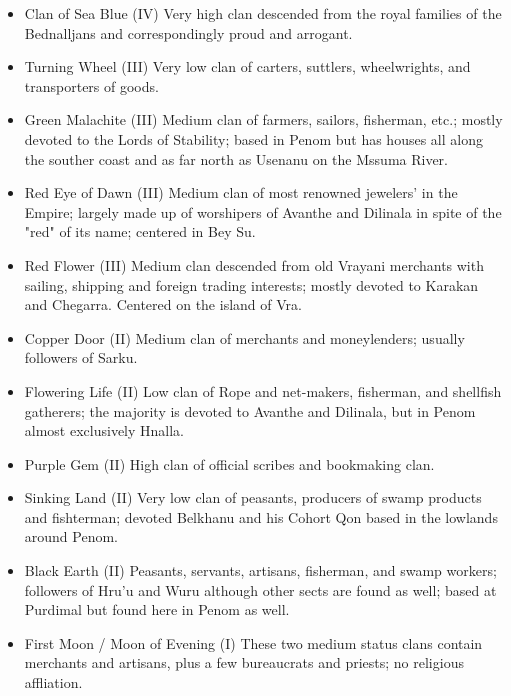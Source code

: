 \begin{itemize}

\item Clan of Sea Blue (IV) Very high clan descended from the royal families of the Bednalljans and correspondingly proud and arrogant. 
\item Turning Wheel (III) Very low clan of carters, suttlers, wheelwrights, and transporters of goods. 
\item Green Malachite (III) Medium clan of farmers, sailors, fisherman, etc.; mostly devoted to the Lords of Stability; based in Penom but has houses all along the souther coast and as far north as Usenanu on the Mssuma River. 
\item Red Eye of Dawn (III) Medium clan of most renowned jewelers' in the Empire; largely made up of worshipers of Avanthe and Dilinala in spite of the "red" of its name; centered in Bey Su.
\item Red Flower (III) Medium clan descended from old Vrayani merchants with sailing, shipping and foreign trading interests; mostly devoted to Karakan and Chegarra. Centered on the island of Vra.
\item Copper Door (II) Medium clan of merchants and moneylenders; usually followers of Sarku. 
\item Flowering Life (II) Low clan of Rope and net-makers, fisherman, and shellfish gatherers; the majority is devoted to Avanthe and Dilinala, but in Penom almost exclusively Hnalla.     
\item Purple Gem (II) High clan of official scribes and bookmaking clan.
\item Sinking Land (II) Very low clan of peasants, producers of swamp products and fishterman; devoted Belkhanu and his Cohort Qon based in the lowlands around Penom. 
\item Black Earth (II) Peasants, servants, artisans, fisherman, and swamp workers; followers of Hru'u and Wuru although other sects are found as well; based at Purdimal but found here in Penom as well.
\item First Moon / Moon of Evening (I) These two medium status clans contain merchants and artisans, plus a few bureaucrats and priests; no religious affliation.

\end{itemize}
